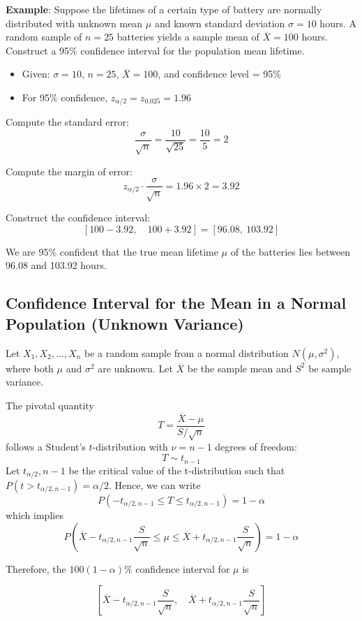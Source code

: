 \documentclass[twoside]{book}
\begin{document}
\textbf{Example}: Suppose the lifetimes of a certain type of battery are normally distributed with unknown mean $\mu$ and known standard deviation $\sigma = 10$ hours. A random sample of $n = 25$ batteries yields a sample mean of $\overline{X} = 100$ hours. Construct a 95\% confidence interval for the population mean lifetime.


\begin{itemize}
	\item Given: $\sigma = 10$, $n = 25$, $\overline{X} = 100$, and confidence level = 95\%
	\item For 95\% confidence, $z_{\alpha/2}= z_{0.025} = 1.96$
\end{itemize}

Compute the standard error:
\[
\frac{\sigma}{\sqrt{n}} = \frac{10}{\sqrt{25}} = \frac{10}{5} = 2
\]

Compute the margin of error:
\[
z_{\alpha/2} \cdot \frac{\sigma}{\sqrt{n}} = 1.96 \times 2 = 3.92
\]

Construct the confidence interval:
\[
\left[100 - 3.92, \quad 100 + 3.92\right] = [96.08,\ 103.92]
\]

We are 95\% confident that the true mean lifetime $\mu$ of the batteries lies between 96.08 and 103.92 hours.


\subsection{Confidence Interval for the Mean in a Normal Population (Unknown Variance)}

Let $X_1, X_2, \dots, X_n$ be a random sample from a normal distribution $N(\mu, \sigma^2)$, where both $\mu$ and $\sigma^2$ are unknown. Let $\overline{X}$ be the sample mean and $S^2$ be sample variance.

The pivotal quantity
\[
T = \frac{\overline{X} - \mu}{S / \sqrt{n}}
\]
follows a Student's $t$-distribution with $\nu = n - 1$ degrees of freedom:
\[
T \sim t_{n-1}
\]
Let $t_{\alpha/2}, n-1$ be the critical value of the t-distribution such that $P(t > t_{\alpha/2, n-1})=\alpha/2$. Hence, we can write
\[
P\left(-t_{\alpha/2, n-1} \leq T \leq t_{\alpha/2, n-1}\right) = 1 - \alpha
\]
which implies
\[
P\left(\overline{X} - t_{\alpha/2, n-1} \frac{S}{\sqrt{n}} \leq \mu \leq \overline{X} + t_{\alpha/2, n-1} \frac{S}{\sqrt{n}}\right) = 1 - \alpha
\]

Therefore, the $100(1-\alpha)\%$ confidence interval for $\mu$ is
\begin{textbox}
\[
\left[\overline{X} - t_{\alpha/2, n-1} \frac{S}{\sqrt{n}}, \quad \overline{X} + t_{\alpha/2, n-1} \frac{S}{\sqrt{n}} \right]
\]
\end{textbox}
\end{document}
